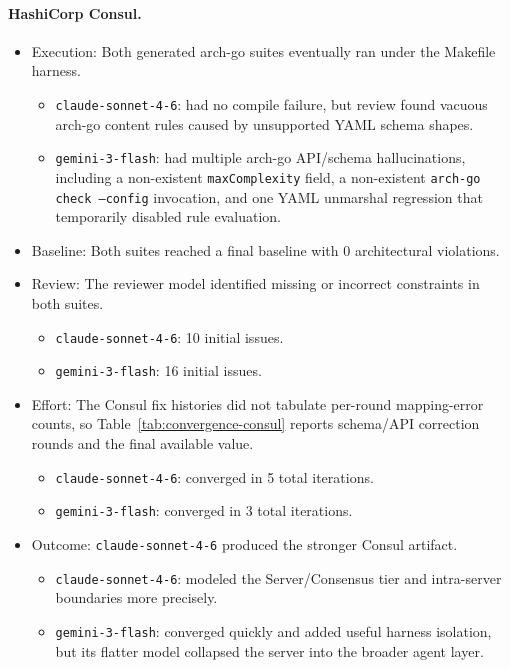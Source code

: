 \documentclass[sigconf,screen]{acmart}
\begin{document}
\paragraph{HashiCorp Consul.}
\begin{itemize}
    \item Execution: Both generated arch-go suites eventually ran under the Makefile harness.
    \begin{itemize}
        \item \texttt{claude-sonnet-4-6}: had no compile failure, but review found vacuous arch-go content rules caused by unsupported YAML schema shapes.
        \item \texttt{gemini-3-flash}: had multiple arch-go API/schema hallucinations, including a non-existent \texttt{maxComplexity} field, a non-existent \texttt{arch-go check --config} invocation, and one YAML unmarshal regression that temporarily disabled rule evaluation.
    \end{itemize}
    \item Baseline: Both suites reached a final baseline with 0 architectural violations.
    \item Review: The reviewer model identified missing or incorrect constraints in both suites.
    \begin{itemize}
        \item \texttt{claude-sonnet-4-6}: 10 initial issues.
        \item \texttt{gemini-3-flash}: 16 initial issues.
    \end{itemize}
    \item Effort: The Consul fix histories did not tabulate per-round mapping-error counts, so Table~\ref{tab:convergence-consul} reports schema/API correction rounds and the final available value.
    \begin{itemize}
        \item \texttt{claude-sonnet-4-6}: converged in 5 total iterations.
        \item \texttt{gemini-3-flash}: converged in 3 total iterations.
    \end{itemize}
    \item Outcome: \texttt{claude-sonnet-4-6} produced the stronger Consul artifact.
    \begin{itemize}
        \item \texttt{claude-sonnet-4-6}: modeled the Server/Consensus tier and intra-server boundaries more precisely.
        \item \texttt{gemini-3-flash}: converged quickly and added useful harness isolation, but its flatter model collapsed the server into the broader agent layer.
    \end{itemize}
\end{itemize}
\end{document}
